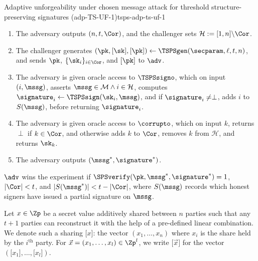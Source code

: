 \begin{experimentbox}{Adaptive unforgeability under chosen message attack for
  threshold structure-preserving signatures (adp-TS-UF-1)}{tsps-adp-ts-uf-1}

  \begin{enumerate}

    \item The adversary outputs $(n, t, \Cor)$, and the challenger sets
      $\mathcal{H} := [1,n] \backslash \Cor$.

    \item The challenger generates $(\pk, \lbrack \sk\rbrack , \lbrack
      \pk\rbrack ) \gets \TSPSgen(\secparam, \ell, t, n)$, and sends $\pk$, $\{\sk_i\}_{i \in
      \Cor}$, and $\lbrack \pk\rbrack $ to $\adv$.

    \item The adversary is given oracle access to $\TSPSsigno$, which on input $(i,
      \mssg)$, asserts $\mssg \in \mathcal{M} \wedge i \in \mathcal{H}$,
      computes $\signature_i \gets \TSPSsign(\sk_i, \mssg)$, and if $\signature_i \neq
      \perp$, adds $i$ to $S(\mssg)$, before returning $\signature_i$.

    \item The adversary is given oracle access to $\corrupto$, which on input
      $k$, returns $\perp$ if $k \in \Cor$, and otherwise adds $k$ to $\Cor$,
      removes $k$ from $\mathcal{H}$, and returns $\sk_k$.

    \item The adversary outputs $(\mssg^*, \signature^*)$.

  \end{enumerate}

  $\adv$ wins the experiment if $\SPSverify(\pk, \mssg^*, \signature^*) = 1$,
  $|\Cor| < t$, and $|S(\mssg^*)| < t - |\Cor|$, where $S(\mssg)$ records which
  honest signers have issued a partial signature on $\mssg$.

\end{experimentbox}

Let $x \in \Zp$ be a secret value additively shared between $n$ parties such
that any $t+1$ parties can reconstruct it with the help of a pre-defined linear
combination. We denote such a sharing $\lbrack x\rbrack $: the vector $(x_1,
\ldots, x_n)$ where $x_i$ is the share held by the $i^{\mathrm{th}}$ party. For
$\vec{x} = (x_1, \ldots, x_l) \in \Zp^l$, we write $\lbrack \vec{x}\rbrack $
for the vector $(\lbrack x_1\rbrack , \ldots, \lbrack x_l\rbrack )$.

